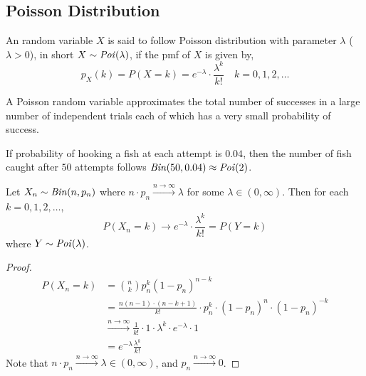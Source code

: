 \subsection{Poisson Distribution}
\begin{definition}
    An random variable $X$ is said to follow Poisson distribution with
parameter $\lambda$ ($\lambda > 0$), in short $X \sim \text{\emph{Poi}}(\lambda)$,
if the pmf of $X$ is given by, 
\begin{equation*}
    p_X(k) = P(X = k) = e^{-\lambda} \cdot \frac{\lambda^k}{k!}
    \quad k = 0, 1, 2, \dots
\end{equation*}
\end{definition}
A Poisson random variable approximates the total number of successes in a large
number of independent trials each of which has a very small probability of
success. 

\begin{example}
    If probability of hooking a fish at each attempt is $0.04$, then the number
of fish caught after $50$ attempts follows $\text{\emph{Bin}}(50, 0.04) \approx
\text{\emph{Poi}}(2)$.
\end{example}

\begin{theorem}
    Let $X_n \sim \text{\emph{Bin}}(n, p_n)$ where $n \cdot p_n \xrightarrow{n
\rightarrow \infty} \lambda$ for some $\lambda \in (0, \infty)$. Then for each
$k = 0, 1, 2, \dots$,
    \[ P(X_n = k) \rightarrow   e^{-\lambda} \cdot \frac{\lambda^k}{k!}
                              = P(Y = k)                                     \]
    where $Y \sim \text{\emph{Poi}}(\lambda)$.
\end{theorem}
\begin{proof}
\begin{align*}
    P(X_n = k) &= {n \choose k} p_n^k (1 - p_n)^{n - k}                      \\
               &= \frac{n(n-1) \cdot (n - k + 1)}{k!} \cdot p_n^k \cdot 
                  (1 - p_n)^n \cdot (1 - p_n)^{-k}                           \\
               &\xrightarrow{n \rightarrow \infty} 
                  \frac{1}{k!} \cdot 1 \cdot \lambda^k \cdot e^{-\lambda} 
                  \cdot 1                                                    \\
               &= e^{-\lambda} \frac{\lambda^k}{k!}  
\end{align*}
Note that $n \cdot p_n \xrightarrow{n \rightarrow \infty} \lambda \in (0,
\infty)$, and $p_n \xrightarrow{n \rightarrow \infty} 0$.
\end{proof}

